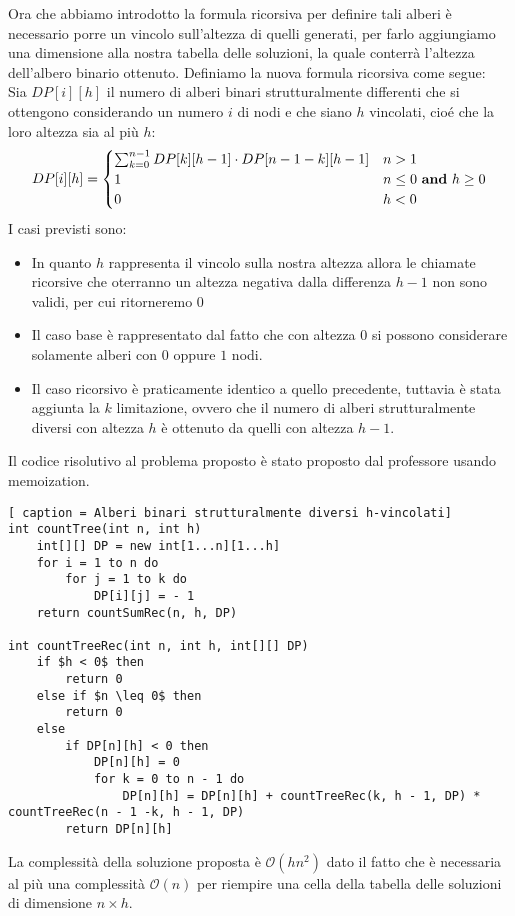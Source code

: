 \documentclass[../cheatSheetAlgoritmi.tex]{subfiles}
\begin{document}
Ora che abbiamo introdotto la formula ricorsiva per definire tali alberi è necessario porre un vincolo sull'altezza di quelli generati, per farlo aggiungiamo una dimensione alla nostra tabella delle soluzioni, la quale conterrà l'altezza dell'albero binario ottenuto. Definiamo la nuova formula ricorsiva come segue: \\
Sia $DP[i][h]$ il numero di alberi binari strutturalmente differenti che si ottengono considerando un numero $i$ di nodi e che siano $h$ vincolati, cioé che la loro altezza sia al più $h$: 
\begin{equation*}
  	DP[i][h] =\begin{cases}
    	\sum_{k = 0}^{n - 1} DP[k][h - 1] \cdot DP[n - 1 - k][h - 1] & \text{$n > 1$}\\
    	1 & \text{$n \leq 0$ \textbf{and} $h \geq 0$} \\
    	0 & \text{$h < 0$}
  	\end{cases}
\end{equation*}
I casi previsti sono: 
\begin{itemize}
	\item In quanto $h$ rappresenta il vincolo sulla nostra altezza allora le chiamate ricorsive che oterranno un altezza negativa dalla differenza $h-1$ non sono validi, per cui ritorneremo $0$
	\item Il caso base è rappresentato dal fatto che con altezza $0$ si possono considerare solamente alberi con $0$ oppure $1$ nodi.
	\item Il caso ricorsivo è praticamente identico a quello precedente, tuttavia è stata aggiunta la $k$ limitazione, ovvero che il numero di alberi strutturalmente diversi con altezza $h$ è ottenuto da quelli con altezza $h - 1$.
\end{itemize}
Il codice risolutivo al problema proposto è stato proposto dal professore usando memoization. 
\begin{lstlisting}[ caption = Alberi binari strutturalmente diversi h-vincolati]
int countTree(int n, int h)
	int[][] DP = new int[1...n][1...h]
	for i = 1 to n do
		for j = 1 to k do
			DP[i][j] = - 1
	return countSumRec(n, h, DP)

int countTreeRec(int n, int h, int[][] DP)
	if $h < 0$ then
		return 0
	else if $n \leq 0$ then
		return 0
	else 
		if DP[n][h] < 0 then
			DP[n][h] = 0
			for k = 0 to n - 1 do
				DP[n][h] = DP[n][h] + countTreeRec(k, h - 1, DP) * countTreeRec(n - 1 -k, h - 1, DP)
		return DP[n][h]
\end{lstlisting}
La complessità della soluzione proposta è $\mathcal{O}(hn^2)$ dato il fatto che è necessaria al più una complessità $\mathcal{O}(n)$ per riempire una cella della tabella delle soluzioni di dimensione $n \times h$.
\newpage
\end{document}

